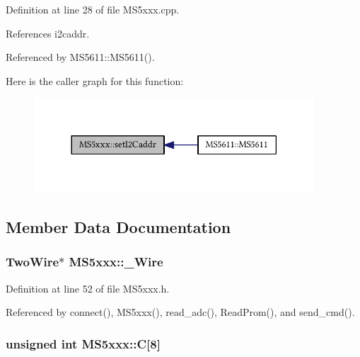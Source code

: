 Definition at line 28 of file M\+S5xxx.\+cpp.



References i2caddr.



Referenced by M\+S5611\+::\+M\+S5611().



Here is the caller graph for this function\+:\nopagebreak
\begin{figure}[H]
\begin{center}
\leavevmode
\includegraphics[width=297pt]{class_m_s5xxx_a6c3d564fe39d14dfa8804fa1600077d7_icgraph}
\end{center}
\end{figure}




\subsection{Member Data Documentation}
\subsubsection[{\texorpdfstring{\+\_\+\+Wire}{\_Wire}}]{\setlength{\rightskip}{0pt plus 5cm}Two\+Wire$\ast$ M\+S5xxx\+::\+\_\+\+Wire\hspace{0.3cm}{\ttfamily [protected]}}\hypertarget{class_m_s5xxx_aa92f0beac7fdd14803aea7564f760980}{}\label{class_m_s5xxx_aa92f0beac7fdd14803aea7564f760980}


Definition at line 52 of file M\+S5xxx.\+h.



Referenced by connect(), M\+S5xxx(), read\+\_\+adc(), Read\+Prom(), and send\+\_\+cmd().

\subsubsection[{\texorpdfstring{C}{C}}]{\setlength{\rightskip}{0pt plus 5cm}unsigned int M\+S5xxx\+::C\mbox{[}8\mbox{]}\hspace{0.3cm}{\ttfamily [protected]}}\hypertarget{class_m_s5xxx_a1e35ed9bb07685736da32495c7d8fd90}{}\label{class_m_s5xxx_a1e35ed9bb07685736da32495c7d8fd90}


